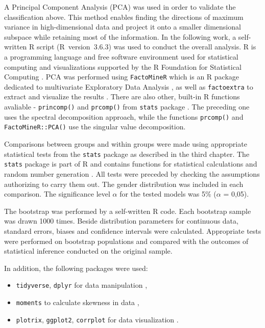 \documentclass[12pt,a4paper,notitlepage]{report}
\begin{document}
A Principal Component Analysis (PCA) was used in order to validate the classification above. This method enables finding the directions of maximum variance in high-dimensional data and project it onto a smaller dimensional subspace while retaining most of the information. In the following work, a self-written R script \mbox{(R version 3.6.3)} was used to conduct the overall analysis. R is a programming language and free software environment used for statistical computing and visualizations supported by the R Foundation for Statistical Computing \cite{RCoreTeam13}. PCA was performed using \texttt{FactoMineR} which is an R package dedicated to multivariate Exploratory Data Analysis \cite{factominer08}, as well as \texttt{factoextra} to extract and visualize the results \cite{factoextra13}. There are also other, built-in R functions avaliable - \texttt{princomp()} and \texttt{prcomp()} from  \texttt{stats} package \cite{RCoreTeam13}. The preceding one uses the spectral decomposition approach, while the functions \texttt{prcomp()} and \texttt{FactoMineR::PCA()} use the singular value decomposition.

Comparisons between groups and within groups were made using appropriate statistical tests from the \texttt{stats} package as described in the third chapter. The \texttt{stats} package is part of R and contains functions for statistical calculations and random number generation \cite{RCoreTeam13}. All tests were preceded by checking the assumptions authorizing to carry them out. The gender distribution was included in each comparison. 
The significance level $\alpha$ for the tested models was 5\% ($\alpha$ = 0,05).

The bootstrap was performed by a self-written R code. Each bootstrap sample was drawn 1000 times. Beside distribution parameters for continuous data, standard errors, biases and confidence intervals were calculated. Appropriate tests were performed on bootstrap populations and compared with the outcomes of statistical inference conducted on the original sample.

In addition, the following packages were used:
\begin{itemize}
\item \texttt{tidyverse}, \texttt{dplyr} for data manipulation \cite{tidyverse19, dplyr18},
\item \texttt{moments}  to calculate skewness in data \cite{moments15},
\item \texttt{plotrix}, \texttt{ggplot2}, \texttt{corrplot} for data visualization \cite{plotrix06, ggplot216, corrplot17}.
\end{itemize}
\end{document}
